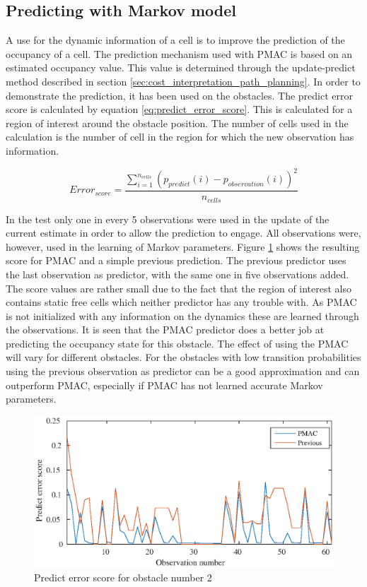 
\subsection{Predicting with Markov model}

A use for the dynamic information of a cell is to improve the prediction of the occupancy of a cell. The prediction mechanism used with PMAC is based on an estimated occupancy value. This value is determined through the update-predict method described in section \vref{sec:cost_interpretation_path_planning}. 
In order to demonstrate the prediction, it has been used on the obstacles. The predict error score is calculated by equation \ref{eq:predict_error_score}. This is calculated for a region of interest around the obstacle position. The number of cells used in the calculation is the number of cell in the region for which the new observation has information. 

\begin{equation}
	Error_{score} = \frac{\sum\limits_{i=1}^{n_{cells}} (p_{predict}(i)-p_{observation}(i))^2}{n_{cells}}
	\label{eq:predict_error_score}
\end{equation} 

In the test only one in every 5 observations were used in the update of the current estimate in order to allow the prediction to engage. All observations were, however, used in the learning of Markov parameters. Figure \ref{fig:markov_predict_obst_2} shows the resulting score for PMAC and a simple previous prediction. The previous predictor uses the last observation as predictor, with the same one in five observations added. The score values are rather small due to the fact that the region of interest also contains static free cells which neither predictor has any trouble with. As PMAC is not initialized with any information on the dynamics these are learned through the observations. 
It is seen that the PMAC predictor does a better job at predicting the occupancy state for this obstacle. The effect of using the PMAC will vary for different obstacles. For the obstacles with low transition probabilities using the previous observation as predictor can be a good approximation and can outperform PMAC, especially if PMAC has not learned  accurate Markov parameters.  

\begin{figure}[htbp]
	\centering
	\includegraphics[scale=1]{chapters/evaluation/figures/markov_predict_figs/obstacle2_low.eps}
	\caption{Predict error score for obstacle number 2}
	\label{fig:markov_predict_obst_2}
	
\end{figure}